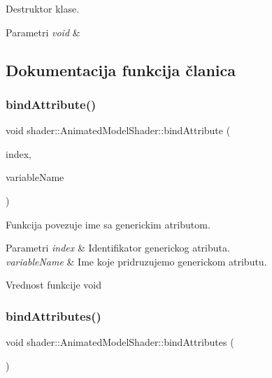 Destruktor klase. 


\begin{DoxyParams}{Parametri}
{\em void} & \\
\hline
\end{DoxyParams}


\subsection{Dokumentacija funkcija članica}
\mbox{\label{classshader_1_1AnimatedModelShader_a3c47a70e671a3b7a974c16562ba589b7}} 
\subsubsection{\texorpdfstring{bind\+Attribute()}{bindAttribute()}}
{\footnotesize\ttfamily void shader\+::\+Animated\+Model\+Shader\+::bind\+Attribute (\begin{DoxyParamCaption}\item[{int}]{index,  }\item[{const char $\ast$}]{variable\+Name }\end{DoxyParamCaption})}



Funkcija povezuje ime sa generickim atributom. 


\begin{DoxyParams}{Parametri}
{\em index} & Identifikator generickog atributa. \\
\hline
{\em variable\+Name} & Ime koje pridruzujemo generickom atributu. \\
\hline
\end{DoxyParams}
\begin{DoxyReturn}{Vrednost funkcije}
void 
\end{DoxyReturn}
\mbox{\label{classshader_1_1AnimatedModelShader_a447ad01d4385f85b47c2d99b076d9b4f}} 
\subsubsection{\texorpdfstring{bind\+Attributes()}{bindAttributes()}}
{\footnotesize\ttfamily void shader\+::\+Animated\+Model\+Shader\+::bind\+Attributes (\begin{DoxyParamCaption}\item[{void}]{ }\end{DoxyParamCaption})}



